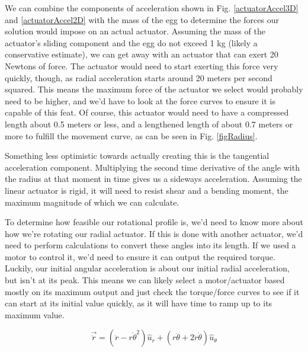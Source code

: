 \documentclass[nofoot,pdf-a,balance,colorlinks,upint,subscriptcorrection,varvw,mathalfa=cal=boondoxo]{asmeconf}
\begin{document}
        We can combine the components of acceleration shown in Fig. \ref{actuatorAccel3D} and \ref{actuatorAccel2D} with the mass of the egg to determine the forces our solution would impose on an actual actuator. Assuming the mass of the actuator's sliding component and the egg do not exceed 1 kg (likely a conservative estimate), we can get away with an actuator that can exert 20 Newtons of force. The actuator would need to start exerting this force very quickly, though, as radial acceleration starts around 20 meters per second squared. This means the maximum force of the actuator we select would probably need to be higher, and we'd have to look at the force curves to ensure it is capable of this feat. Of course, this actuator would need to have a compressed length about 0.5 meters or less, and a lengthened length of about 0.7 meters or more to fulfill the movement curve, as can be seen in Fig. \ref{figRadius}.

        Something less optimistic towards actually creating this is the tangential acceleration component. Multiplying the second time derivative of the angle with the radius at that moment in time gives us a sideways acceleration. Assuming the linear actuator is rigid, it will need to resist shear and a bending moment, the maximum magnitude of which we can calculate.

        To determine how feasible our rotational profile is, we'd need to know more about how we're rotating our radial actuator. If this is done with another actuator, we'd need to perform calculations to convert these angles into its length. If we used a motor to control it, we'd need to ensure it can output the required torque. Luckily, our initial angular acceleration is about our initial radial acceleration, but isn't at its peak. This means we can likely select a motor/actuator based mostly on its maximum output and just check the torque/force curves to see if it can start at its initial value quickly, as it will have time to ramp up to its maximum value.

        \begin{equation} 
            \vec{\ddot{r}} = \left(\ddot{r} - r{\dot{\theta}}^2\right)\hat{u}_r + \left(r\ddot{\theta} + 2\dot{r}\dot{\theta}\right)\hat{u}_{\theta}
        \end{equation}
\end{document}
